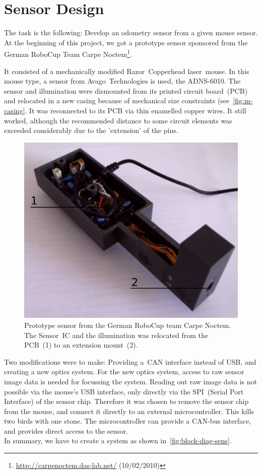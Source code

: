 \documentclass[12pt,a4paper]{article}
\begin{document}

\clearpage
\section{Sensor Design}

The task is the following: Develop an odometry sensor from a given mouse sensor.
At the beginning of this project, we got a prototype sensor sponsored from the German RoboCup Team Carpe Noctem\footnote{\url{http://carpenoctem.das-lab.net/} (10/02/2010)}.

It consisted of a mechanically modified Razor~Copperhead laser~mouse.
In this mouse type, a sensor from Avago~Technologies is used, the ADNS-6010.
The sensor and illumination were dismounted from its printed circuit board~(PCB) and relocated in a new casing because of mechanical size constraints (see~\autoref{fig:m-casing}.
It was reconnected to its PCB via thin enamelled copper wires.
It still worked, although the recommended distance to some circuit elements was exceeded considerably due to the 'extension' of the pins.

\begin{figure}[hb]
\begin{center}  
\includegraphics[width=0.6\columnwidth]{figures/proto.pdf}
\caption{\label{fig:m-casing}
Prototype sensor from the German RoboCup team Carpe Noctem.
The Sensor~IC and the illumination was relocated from the PCB~(1) to an extension mount~(2).
}   
\end{center}
\end{figure}

Two modifications were to make: Providing a~CAN interface instead of USB, and creating a new optics system.
For the new optics system, access to raw sensor image data is needed for focussing the system.
Reading out raw image data is not possible via the mouse's USB interface, only directly via the SPI~(Serial Port Interface) of the sensor chip.
Therefore it was chosen to remove the sensor chip from the mouse, and connect it directly to an external microcontroller.
This kills two birds with one stone.
The microcontroller can provide a CAN-bus interface, and provides direct access to the sensor.\\
In summary, we have to create a system as shown in~\autoref{fig:block-diag-sens}.
\end{document}
